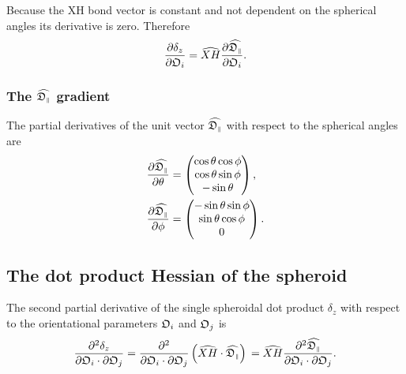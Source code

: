 \noindent Because the XH bond vector is constant and not dependent on the spherical angles its derivative is zero.  Therefore
\begin{equation}
    \frac{\partial \delta_z}{\partial \mathfrak{O}_i} = \widehat{XH} \frac{\partial \widehat{\mathfrak{D}_{\scriptscriptstyle \parallel}}}{\partial \mathfrak{O}_i}.
\end{equation}



\subsubsection{The $\widehat{\mathfrak{D}_{\scriptscriptstyle \parallel}}$ gradient}

The partial derivatives of the unit vector $\widehat{\mathfrak{D}_{\scriptscriptstyle \parallel}}$ with respect to the spherical angles are
\begin{subequations}
\begin{align}
    \frac{\partial \widehat{\mathfrak{D}_{\scriptscriptstyle \parallel}}}{\partial \theta} &= \begin{pmatrix}
        \cos \theta \cos \phi \\
        \cos \theta \sin \phi \\
        -\sin \theta \\
    \end{pmatrix}, \\
    \frac{\partial \widehat{\mathfrak{D}_{\scriptscriptstyle \parallel}}}{\partial \phi} &= \begin{pmatrix}
        -\sin \theta \sin \phi \\
        \sin \theta \cos \phi \\
        0 \\
    \end{pmatrix}.
\end{align}
\end{subequations}




\subsection{The dot product Hessian of the spheroid}

The second partial derivative of the single spheroidal dot product $\delta_z$ with respect to the orientational parameters $\mathfrak{O}_i$ and $\mathfrak{O}_j$ is
\begin{equation}
    \frac{\partial^2 \delta_z}{\partial \mathfrak{O}_i \cdot \partial \mathfrak{O}_j}
        = \frac{\partial^2}{\partial \mathfrak{O}_i \cdot \partial \mathfrak{O}_j} \left( \widehat{XH} \cdot \widehat{\mathfrak{D}_{\scriptscriptstyle \parallel}} \right) \\
        = \widehat{XH} \frac{\partial^2 \widehat{\mathfrak{D}_{\scriptscriptstyle \parallel}}}{\partial \mathfrak{O}_i \cdot \partial \mathfrak{O}_j}.
\end{equation}



